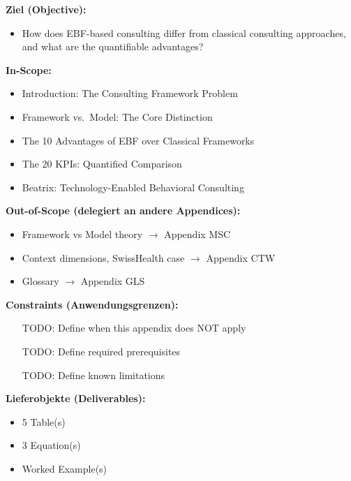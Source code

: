 \begin{tcolorbox}[
    colback=orange!5!white,
    colframe=orange!75!black,
    title={\textbf{Appendix Scope: Ziel / In-Scope / Out-of-Scope / Constraints}},
    fonttitle=\bfseries
]

\textbf{Ziel (Objective):}
\begin{itemize}[nosep]
    \item How does EBF-based consulting differ from classical consulting approaches,
and what are the quantifiable advantages?
\end{itemize}

\textbf{In-Scope:}
\begin{itemize}[nosep]
    \item Introduction: The Consulting Framework Problem
    \item Framework vs.\ Model: The Core Distinction
    \item The 10 Advantages of EBF over Classical Frameworks
    \item The 20 KPIs: Quantified Comparison
    \item Beatrix: Technology-Enabled Behavioral Consulting
\end{itemize}

\textbf{Out-of-Scope (delegiert an andere Appendices):}
\begin{itemize}[nosep]
    \item Framework vs Model theory $\rightarrow$ Appendix MSC
    \item Context dimensions, SwissHealth case $\rightarrow$ Appendix CTW
    \item Glossary $\rightarrow$ Appendix GLS
\end{itemize}

\textbf{Constraints (Anwendungsgrenzen):}
\begin{itemize}[nosep]
    \item [TODO: Define when this appendix does NOT apply]
    \item [TODO: Define required prerequisites]
    \item [TODO: Define known limitations]
\end{itemize}

\textbf{Lieferobjekte (Deliverables):}
\begin{itemize}[nosep]
    \item 5 Table(s)
    \item 3 Equation(s)
    \item Worked Example(s)
\end{itemize}

\end{tcolorbox}


